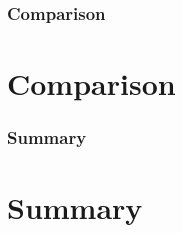 \documentclass[30pt]{beamer}
\begin{document}
\begin{frame}
\frametitle{Comparison}
\section{Comparison}
\end{frame}

\begin{frame}
\frametitle{Summary}
\section{Summary}
\end{frame}
\end{document}

